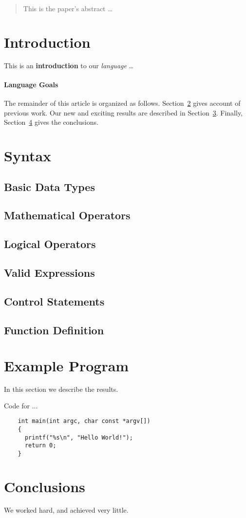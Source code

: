 \documentclass[10pt]{article}
\begin{document}
\maketitle

\begin{abstract}
This is the paper's abstract \ldots
\end{abstract}

\section{Introduction}
This is an \textbf{introduction} to our \emph{language} \ldots

\paragraph{Language Goals}
The remainder of this article is organized as follows.
Section~\ref{previous work} gives account of previous work.
Our new and exciting results are described in Section~\ref{results}.
Finally, Section~\ref{conclusions} gives the conclusions.

\section{Syntax}\label{previous work}

\subsection{Basic Data Types}
\subsection{Mathematical Operators}
\subsection{Logical Operators}
\subsection{Valid Expressions}
\subsection{Control Statements}
\subsection{Function Definition}

\section{Example Program}\label{results}
In this section we describe the results.
\begin{listing}[H]
  \caption{Code for ...}
  \begin{verbatim}
    int main(int argc, char const *argv[])
    {
      printf("%s\n", "Hello World!");
      return 0;
    }
  \end{verbatim}
  \label{lst:the-code}
\end{listing}

\section{Conclusions}\label{conclusions}
We worked hard, and achieved very little.



\end{document}
